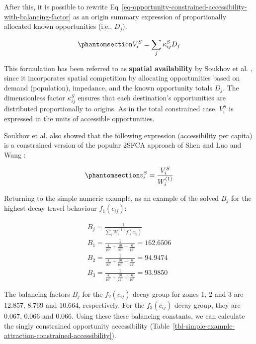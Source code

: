 \documentclass[
  10pt,
  letterpaper,
]{article}
\begin{document}
After this, it is possible to rewrite
Eq~\ref{eq-opportunity-constrained-accessibility-with-balancing-factor}
as an origin summary expression of proportionally allocated known
opportunities (i.e., \(D_j\)).

\begin{equation}\phantomsection\label{eq-attraction-constrained-accessibility-with-proportional-allocation-factor}{
V^S_{i} = \sum_j \kappa^S_{ij} D_j
}\end{equation}

This formulation has been referred to as \textbf{spatial availability}
by Soukhov et al. \citep{soukhovIntroducingSpatialAvailability2023},
since it incorporates spatial competition by allocating opportunities
based on demand (population), impedance, and the known opportunity
totals \(D_j\). The dimensionless factor \(\kappa^S_{ij}\) ensures that
each destination's opportunities are distributed proportionally to
origins. As in the total constrained case, \(V_i^S\) is expressed in the
units of accessible opportunities.

Soukhov et al. \citep{soukhovIntroducingSpatialAvailability2023} also
showed that the following expression (accessibility per capita) is a
constrained version of the popular 2SFCA approach of Shen
\citep{shen1998} and Luo and Wang \citep{luo2003}:

\begin{equation}\phantomsection\label{eq-opportunity-constrained-accessibility-per-capita}{
v^S_{i} = \frac{V^S_{i}}{W^{(1)}_i}
}\end{equation}

Returning to the simple numeric example, as an example of the solved
\(B_{j}\) for the highest decay travel behaviour \(f_1(c_{ij})\):

\[
\begin{array}{l}
B_{j} = \frac{1}{\sum_i W_i^{(1)} f(c_{ij})}\\
B_{1} =  \frac{1}{\frac{4}{10^3} + \frac{10}{30^3} + \frac{6}{15^3}} = 162.6506\\ 
B_{2} =  \frac{1}{\frac{4}{30^3} + \frac{10}{10^3} + \frac{6}{25^3}} = 94.9474\\
B_{3} =  \frac{1}{\frac{4}{10^3} + \frac{10}{25^3} + \frac{6}{10^3}} = 93.9850
\end{array}
\]

The balancing factors \(B_j\) for the \(f_2(c_{ij})\) decay group for
zones 1, 2 and 3 are 12.857, 8.769 and 10.664, respectively. For the
\(f_3(c_{ij})\) decay group, they are 0.067, 0.066 and 0.066. Using
these these balancing constants, we can calculate the singly constrained
opportunity accessibility
(Table~\ref{tbl-simple-example-attraction-constrained-accessibility}).
\end{document}
